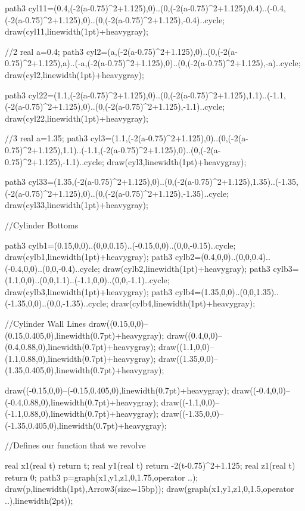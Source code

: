     path3 cyl11=(0.4,(-2(a-0.75)^2+1.125),0)..(0,(-2(a-0.75)^2+1.125),0.4)..(-0.4,(-2(a-0.75)^2+1.125),0)..(0,(-2(a-0.75)^2+1.125),-0.4)..cycle;
    	draw(cyl11,linewidth(1pt)+heavygray);
    
    //2	
   	real a=0.4;
		path3 cyl2=(a,(-2(a-0.75)^2+1.125),0)..(0,(-2(a-0.75)^2+1.125),a)..(-a,(-2(a-0.75)^2+1.125),0)..(0,(-2(a-0.75)^2+1.125),-a)..cycle;
    	draw(cyl2,linewidth(1pt)+heavygray);
    	
    path3 cyl22=(1.1,(-2(a-0.75)^2+1.125),0)..(0,(-2(a-0.75)^2+1.125),1.1)..(-1.1,(-2(a-0.75)^2+1.125),0)..(0,(-2(a-0.75)^2+1.125),-1.1)..cycle;
    	draw(cyl22,linewidth(1pt)+heavygray);
    	
    //3
    real a=1.35;
		path3 cyl3=(1.1,(-2(a-0.75)^2+1.125),0)..(0,(-2(a-0.75)^2+1.125),1.1)..(-1.1,(-2(a-0.75)^2+1.125),0)..(0,(-2(a-0.75)^2+1.125),-1.1)..cycle;
    	draw(cyl3,linewidth(1pt)+heavygray);
    
    path3 cyl33=(1.35,(-2(a-0.75)^2+1.125),0)..(0,(-2(a-0.75)^2+1.125),1.35)..(-1.35,(-2(a-0.75)^2+1.125),0)..(0,(-2(a-0.75)^2+1.125),-1.35)..cycle;
    	draw(cyl33,linewidth(1pt)+heavygray);
    	
    	
	//Cylinder Bottoms
    	
    path3 cylb1=(0.15,0,0)..(0,0,0.15)..(-0.15,0,0)..(0,0,-0.15)..cycle;
    	draw(cylb1,linewidth(1pt)+heavygray);	
    path3 cylb2=(0.4,0,0)..(0,0,0.4)..(-0.4,0,0)..(0,0,-0.4)..cycle;
    	draw(cylb2,linewidth(1pt)+heavygray);
    path3 cylb3=(1.1,0,0)..(0,0,1.1)..(-1.1,0,0)..(0,0,-1.1)..cycle;
    	draw(cylb3,linewidth(1pt)+heavygray);
    path3 cylb4=(1.35,0,0)..(0,0,1.35)..(-1.35,0,0)..(0,0,-1.35)..cycle;
    	draw(cylb4,linewidth(1pt)+heavygray);
    	
   	//Cylinder Wall Lines
   		draw((0.15,0,0)--(0.15,0.405,0),linewidth(0.7pt)+heavygray);
   		draw((0.4,0,0)--(0.4,0.88,0),linewidth(0.7pt)+heavygray);
   		draw((1.1,0,0)--(1.1,0.88,0),linewidth(0.7pt)+heavygray);
   		draw((1.35,0,0)--(1.35,0.405,0),linewidth(0.7pt)+heavygray);
   		
   		draw((-0.15,0,0)--(-0.15,0.405,0),linewidth(0.7pt)+heavygray);
   		draw((-0.4,0,0)--(-0.4,0.88,0),linewidth(0.7pt)+heavygray);
   		draw((-1.1,0,0)--(-1.1,0.88,0),linewidth(0.7pt)+heavygray);
   		draw((-1.35,0,0)--(-1.35,0.405,0),linewidth(0.7pt)+heavygray);
    
    //Defines our function that we revolve
    
    	real x1(real t) {return t;}
		real y1(real t) {return -2(t-0.75)^2+1.125;}
		real z1(real t) {return 0;}
    	path3 p=graph(x1,y1,z1,0,1.75,operator ..);
        draw(p,linewidth(1pt),Arrow3(size=15bp));
        draw(graph(x1,y1,z1,0,1.5,operator ..),linewidth(2pt));
        
